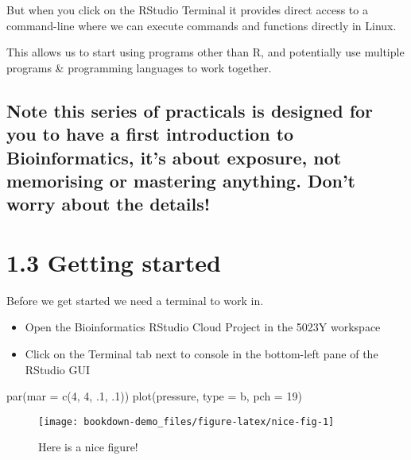 \documentclass[
]{book}
\newenvironment{Shaded}{\begin{snugshade}}{\end{snugshade}}
\newcommand{\AttributeTok}[1]{\textcolor[rgb]{0.77,0.63,0.00}{#1}}
\newcommand{\DecValTok}[1]{\textcolor[rgb]{0.00,0.00,0.81}{#1}}
\newcommand{\FunctionTok}[1]{\textcolor[rgb]{0.00,0.00,0.00}{#1}}
\newcommand{\NormalTok}[1]{#1}
\newcommand{\StringTok}[1]{\textcolor[rgb]{0.31,0.60,0.02}{#1}}
\begin{document}
But when you click on the RStudio Terminal it provides direct access to a command-line where we can execute commands and functions directly in Linux.

This allows us to start using programs other than R, and potentially use multiple programs \& programming languages to work together.

\hypertarget{note-this-series-of-practicals-is-designed-for-you-to-have-a-first-introduction-to-bioinformatics-its-about-exposure-not-memorising-or-mastering-anything.-dont-worry-about-the-details}{%
\subsection{Note this series of practicals is designed for you to have a first introduction to Bioinformatics, it's about exposure, not memorising or mastering anything. Don't worry about the details!}\label{note-this-series-of-practicals-is-designed-for-you-to-have-a-first-introduction-to-bioinformatics-its-about-exposure-not-memorising-or-mastering-anything.-dont-worry-about-the-details}}

\hypertarget{getting-started}{%
\section{1.3 Getting started}\label{getting-started}}

Before we get started we need a terminal to work in.

\begin{itemize}
\item
  Open the Bioinformatics RStudio Cloud Project in the 5023Y workspace
\item
  Click on the Terminal tab next to console in the bottom-left pane of the RStudio GUI
\end{itemize}

\begin{Shaded}
\begin{Highlighting}[]
\FunctionTok{par}\NormalTok{(}\AttributeTok{mar =} \FunctionTok{c}\NormalTok{(}\DecValTok{4}\NormalTok{, }\DecValTok{4}\NormalTok{, .}\DecValTok{1}\NormalTok{, .}\DecValTok{1}\NormalTok{))}
\FunctionTok{plot}\NormalTok{(pressure, }\AttributeTok{type =} \StringTok{\textquotesingle{}b\textquotesingle{}}\NormalTok{, }\AttributeTok{pch =} \DecValTok{19}\NormalTok{)}
\end{Highlighting}
\end{Shaded}

\begin{figure}

{\centering \texttt{[image: bookdown-demo\_files/figure-latex/nice-fig-1]} 

}

\caption{Here is a nice figure!}\label{fig:nice-fig}
\end{figure}
\end{document}
